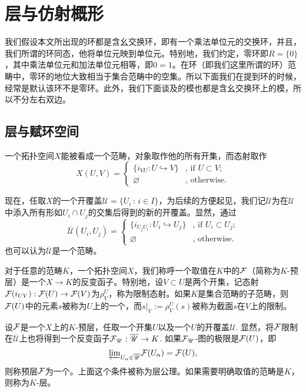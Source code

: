 
\chapter{层与仿射概形}

我们假设本文所出现的环都是含幺交换环，即有一个乘法单位元的交换环，并且，我们所谓的环同态，他将单位元映到单位元。特别地，我们约定，零环即$R=\{0\}$，其中乘法单位元和加法单位元相等，即$0=1$。在环（即我们这里所谓的环）范畴中，零环的地位大致相当于集合范畴中的空集。所以下面我们在提到环的时候，经常是默认该环不是零环。此外，我们下面谈及的模也都是含幺交换环上的模，所以不分左右双边。

\section{层与赋环空间}

\begin{para}
一个拓扑空间$X$能被看成一个范畴，对象取作他的所有开集，而态射取作
\[
	X(U,V)=\begin{cases}
	\bigl\{i_{VU}:U\hookrightarrow V\bigr\}&\text{, if }U\subset V\text{;}\\
	\varnothing&\text{, otherwise}.
	\end{cases}
\]

现在，任取$X$的一个开覆盖$\mathscr{U}=\{U_i\,:\, i\in I\}$，为后续的方便起见，我们记$\overline{\mathscr{U}}$为在$\mathscr{U}$中添入所有形如$U_i\cap U_j$的交集后得到的新的开覆盖。显然，通过
\[
	\overline{\mathscr{U}}(U_i,U_j)=\begin{cases}
	\bigl\{i_{U_jU_i}:U_i\hookrightarrow U_j\bigr\}&\text{, if }U_i\subset U_j\text{;}\\
	\varnothing&\text{, otherwise}.
	\end{cases}
\]
也可以认为$\overline{\mathscr{U}}$是一个范畴。
\end{para}

\begin{para}
对于任意的范畴$K$，一个拓扑空间$X$，我们称呼一个取值在$K$中的$\mathcal{F}$（简称为$K$-预层）是一个$X\to K$的反变函子。特别地，设$V\subset U$是两个开集，记态射$\mathcal{F}(i_{UV}):\mathcal{F}(U)\to \mathcal{F}(V)$为$\rho^U_{V}$，称为限制态射。如果$K$是集合范畴的子范畴，则$\mathcal{F}(U)$中的元素$s$被称为$U$上的一个，而$s|_V:=\rho^U_V(s)$被称为截面$s$在$V$上的限制。

设$\mathcal{F}$是一个$X$上的$K$-预层，任取一个开集$U$以及一个$U$的开覆盖$\mathscr{U}$. 显然，将$\mathcal{F}$限制在$\overline{\mathscr{U}}$上也将得到一个反变函子$\mathcal{F}_\mathscr{U}:\overline{\mathscr{U}}\to K$. 如果$\mathcal{F}_\mathscr{U}$-图的极限是$\mathcal{F}(U)$，即
\[
	{\varprojlim}_{U_\alpha\in \overline{\mathscr{U}}}\mathcal{F}(U_\alpha)=\mathcal{F}(U),
\]
则称预层$\mathcal{F}$为一个。上面这个条件被称为层公理。如果需要明确取值的范畴是$K$，则称为$K$-层。
\end{para}

